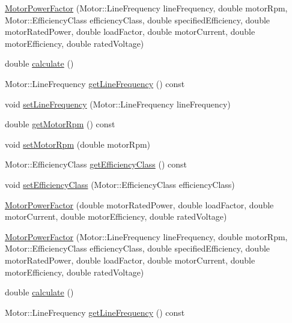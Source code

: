 \begin{DoxyCompactItemize}
\item 
\hyperlink{class_motor_power_factor_ab48906ae429e7c6f05cebaed14fe2ca1}{Motor\+Power\+Factor} (Motor\+::\+Line\+Frequency line\+Frequency, double motor\+Rpm, Motor\+::\+Efficiency\+Class efficiency\+Class, double specified\+Efficiency, double motor\+Rated\+Power, double load\+Factor, double motor\+Current, double motor\+Efficiency, double rated\+Voltage)
\item 
double \hyperlink{class_motor_power_factor_ac9d5742db4a371bc4e15d5b29d335b6e}{calculate} ()
\item 
Motor\+::\+Line\+Frequency \hyperlink{class_motor_power_factor_aa4cdc420b1f611bcb9f4a69c69c1fabf}{get\+Line\+Frequency} () const
\item 
void \hyperlink{class_motor_power_factor_a5186ccae4191cfc5b2b7c3bdbd166563}{set\+Line\+Frequency} (Motor\+::\+Line\+Frequency line\+Frequency)
\item 
double \hyperlink{class_motor_power_factor_acc7e144fc6c05446141cb0e07be03d70}{get\+Motor\+Rpm} () const
\item 
void \hyperlink{class_motor_power_factor_a4154bf52c6c9c9e5fb2f0985d7ae3531}{set\+Motor\+Rpm} (double motor\+Rpm)
\item 
Motor\+::\+Efficiency\+Class \hyperlink{class_motor_power_factor_a1ce98cb6ae9fbf09b05b4b6bd75e5c71}{get\+Efficiency\+Class} () const
\item 
void \hyperlink{class_motor_power_factor_add3125243d7f11131abc4e1d172ffdfc}{set\+Efficiency\+Class} (Motor\+::\+Efficiency\+Class efficiency\+Class)
\item 
\hyperlink{class_motor_power_factor_a1a2509240f0f759952debf47b7ef3a14}{Motor\+Power\+Factor} (double motor\+Rated\+Power, double load\+Factor, double motor\+Current, double motor\+Efficiency, double rated\+Voltage)
\item 
\hyperlink{class_motor_power_factor_ab48906ae429e7c6f05cebaed14fe2ca1}{Motor\+Power\+Factor} (Motor\+::\+Line\+Frequency line\+Frequency, double motor\+Rpm, Motor\+::\+Efficiency\+Class efficiency\+Class, double specified\+Efficiency, double motor\+Rated\+Power, double load\+Factor, double motor\+Current, double motor\+Efficiency, double rated\+Voltage)
\item 
double \hyperlink{class_motor_power_factor_ac9d5742db4a371bc4e15d5b29d335b6e}{calculate} ()
\item 
Motor\+::\+Line\+Frequency \hyperlink{class_motor_power_factor_aa4cdc420b1f611bcb9f4a69c69c1fabf}{get\+Line\+Frequency} () const
\item 

\end{DoxyCompactItemize}
